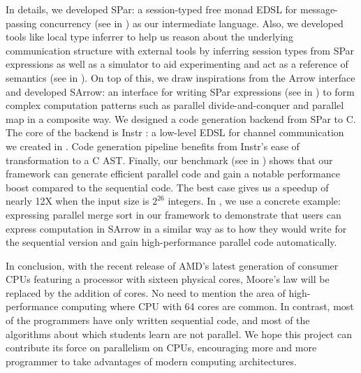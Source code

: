 In details, we developed SPar: a session-typed free monad EDSL for message-passing concurrency (see in ) as our intermediate language. Also, we developed tools like local type inferrer to help us reason about the underlying communication structure with external tools by inferring session types from SPar expressions as well as a simulator to aid experimenting and act as a reference of semantics (see in ). On top of this, we draw inspirations from the Arrow interface and developed SArrow: an interface for writing SPar expressions (see in ) to form complex computation patterns such as parallel divide-and-conquer and parallel map in a composite way. We designed a code generation backend from SPar to C. The core of the backend is Instr : a low-level EDSL for channel communication we created in . Code generation pipeline benefits from Instr's ease of transformation to a C AST. Finally, our benchmark (see in ) shows that our framework can generate efficient parallel code and gain a notable performance boost compared to the sequential code. The best case gives us a speedup of nearly 12X when the input size is $2^{26}$ integers. In , we use a concrete example: expressing parallel merge sort in our framework to demonstrate that users can express computation in SArrow in a similar way as to how they would write for the sequential version and gain high-performance parallel code automatically.

In conclusion, with the recent release of AMD's latest generation of consumer CPUs featuring a processor with sixteen physical cores, Moore's law will be replaced by the addition of cores. No need to mention the area of high-performance computing where CPU with 64 cores are common. In contrast, most of the programmers have only written sequential code, and most of the algorithms about which students learn are not parallel. We hope this project can contribute its force on parallelism on CPUs, encouraging more and more programmer to take advantages of modern computing architectures.
